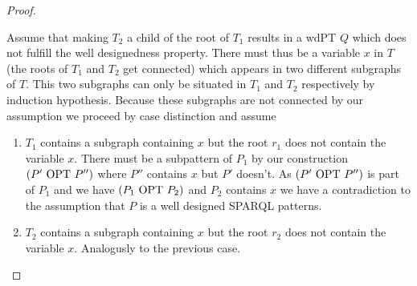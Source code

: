 \begin{proof}
\begin{enumerate}
\begin{enumerate}
					Assume that making $T_2$ a child of the root of $T_1$ 
					results in a wdPT $Q$ which does not fulfill the well designedness property.
					There must thus be a variable $x$ in $T$ (the roots of $T_1$
					and $T_2$ get connected) which appears in two different subgraphs of $T$. This
					two subgraphs can only be situated in $T_1$ and $T_2$ respectively by induction
					hypothesis.	Because these subgraphs are not connected 
					by our assumption we proceed by	case distinction and assume 
					\begin{enumerate}
						\item $T_1$ contains a subgraph containing $x$ but the root $r_1$ does not
							contain the variable $x$. There must be a subpattern of $P_1$ by our
							construction $(P' \mbox{ OPT } P'')$ where $P''$ contains $x$ but $P'$ doesn't. 
							As $(P' \mbox{ OPT } P'')$ is part of $P_1$ 
							and we have $(P_1 \mbox{ OPT } P_2)$ and $P_2$ contains $x$ we have a
							contradiction to the assumption that $P$ is a well designed SPARQL
							patterns.
						\item $T_2$ contains a subgraph containing $x$ but the root $r_2$ does not
							contain the variable $x$.  Analogusly to the previous case.
					\end{enumerate}




\end{enumerate}
\end{enumerate}
\end{proof}
